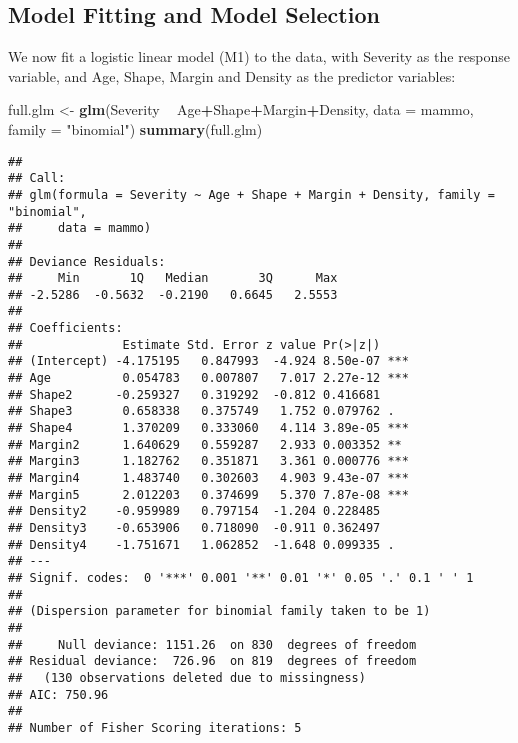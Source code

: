\documentclass[]{article}
\newenvironment{Shaded}{\begin{snugshade}}{\end{snugshade}}
\newcommand{\KeywordTok}[1]{\textcolor[rgb]{0.13,0.29,0.53}{\textbf{#1}}}
\newcommand{\DataTypeTok}[1]{\textcolor[rgb]{0.13,0.29,0.53}{#1}}
\newcommand{\StringTok}[1]{\textcolor[rgb]{0.31,0.60,0.02}{#1}}
\newcommand{\OperatorTok}[1]{\textcolor[rgb]{0.81,0.36,0.00}{\textbf{#1}}}
\newcommand{\NormalTok}[1]{#1}
\begin{document}
\subsection{Model Fitting and Model
Selection}\label{model-fitting-and-model-selection}

We now fit a logistic linear model (M1) to the data, with Severity as
the response variable, and Age, Shape, Margin and Density as the
predictor variables:

\begin{Shaded}
\begin{Highlighting}[]
\NormalTok{full.glm <-}\StringTok{ }\KeywordTok{glm}\NormalTok{(Severity }\OperatorTok{~}\StringTok{ }\NormalTok{Age}\OperatorTok{+}\NormalTok{Shape}\OperatorTok{+}\NormalTok{Margin}\OperatorTok{+}\NormalTok{Density, }\DataTypeTok{data =}\NormalTok{ mammo, }\DataTypeTok{family =} \StringTok{"binomial"}\NormalTok{)}
\KeywordTok{summary}\NormalTok{(full.glm)}
\end{Highlighting}
\end{Shaded}

\begin{verbatim}
## 
## Call:
## glm(formula = Severity ~ Age + Shape + Margin + Density, family = "binomial", 
##     data = mammo)
## 
## Deviance Residuals: 
##     Min       1Q   Median       3Q      Max  
## -2.5286  -0.5632  -0.2190   0.6645   2.5553  
## 
## Coefficients:
##              Estimate Std. Error z value Pr(>|z|)    
## (Intercept) -4.175195   0.847993  -4.924 8.50e-07 ***
## Age          0.054783   0.007807   7.017 2.27e-12 ***
## Shape2      -0.259327   0.319292  -0.812 0.416681    
## Shape3       0.658338   0.375749   1.752 0.079762 .  
## Shape4       1.370209   0.333060   4.114 3.89e-05 ***
## Margin2      1.640629   0.559287   2.933 0.003352 ** 
## Margin3      1.182762   0.351871   3.361 0.000776 ***
## Margin4      1.483740   0.302603   4.903 9.43e-07 ***
## Margin5      2.012203   0.374699   5.370 7.87e-08 ***
## Density2    -0.959989   0.797154  -1.204 0.228485    
## Density3    -0.653906   0.718090  -0.911 0.362497    
## Density4    -1.751671   1.062852  -1.648 0.099335 .  
## ---
## Signif. codes:  0 '***' 0.001 '**' 0.01 '*' 0.05 '.' 0.1 ' ' 1
## 
## (Dispersion parameter for binomial family taken to be 1)
## 
##     Null deviance: 1151.26  on 830  degrees of freedom
## Residual deviance:  726.96  on 819  degrees of freedom
##   (130 observations deleted due to missingness)
## AIC: 750.96
## 
## Number of Fisher Scoring iterations: 5
\end{verbatim}
\end{document}
